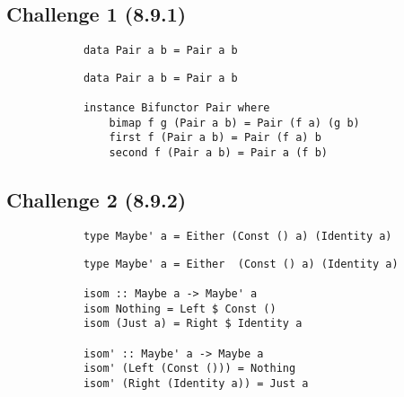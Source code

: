 \documentclass[11pt]{article}
\begin{document}
    \subsection*{Challenge 1 (8.9.1)}
        \begin{verbatim}
            data Pair a b = Pair a b
        \end{verbatim}
        \begin{verbatim}
            data Pair a b = Pair a b

            instance Bifunctor Pair where
                bimap f g (Pair a b) = Pair (f a) (g b)
                first f (Pair a b) = Pair (f a) b
                second f (Pair a b) = Pair a (f b)
        \end{verbatim}

    \subsection*{Challenge 2 (8.9.2)}
        \begin{verbatim}
            type Maybe' a = Either (Const () a) (Identity a)
        \end{verbatim}
        \begin{verbatim}
            type Maybe' a = Either  (Const () a) (Identity a)

            isom :: Maybe a -> Maybe' a
            isom Nothing = Left $ Const ()
            isom (Just a) = Right $ Identity a

            isom' :: Maybe' a -> Maybe a
            isom' (Left (Const ())) = Nothing
            isom' (Right (Identity a)) = Just a
        \end{verbatim}
\end{document}
